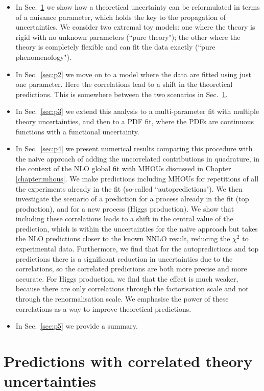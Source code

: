\begin{itemize}
\item In Sec.~\ref{sec:p1} we show how a theoretical uncertainty can be reformulated in terms of a nuisance parameter, which holds the key to the propagation of uncertainties. We consider two extremal toy models: one where the theory is rigid with no unknown parameters (``pure theory"); the other where the theory is completely flexible and can fit the data exactly (``pure phenomenology"). 
\item In Sec.~\ref{sec:p2} we move on to a model where the data are fitted using just one parameter. Here the correlations lead to a shift in the theoretical predictions. This is somewhere between the two scenarios in Sec.~\ref{sec:p1}.
\item In Sec.~\ref{sec:p3} we extend this analysis to a multi-parameter fit with multiple theory uncertainties, and then to a PDF fit, where the PDFs are continuous functions with a functional uncertainty. 
\item In Sec.~\ref{sec:p4} we present numerical results comparing this procedure with the naive approach of adding the uncorrelated contributions in quadrature, in the context of the NLO global fit with MHOUs discussed in Chapter \ref{chapter:mhous}. We make predictions including MHOUs for repetitions of all the experiments already in the fit (so-called ``autopredictions"). We then investigate the scenario of a prediction for a process already in the fit (top production), and for a new process (Higgs production). We show that including these correlations leads to a shift in the central value of the prediction, which is within the uncertainties for the naive approach but takes the NLO predictions closer to the known NNLO result, reducing the $\chi^2$ to experimental data. Furthermore, we find that for the autopredictions and top predictions there is a significant reduction in uncertainties due to the correlations, so the correlated predictions are both more precise and more accurate. For Higgs production, we find that the effect is much weaker, because there are only correlations through the factorisation scale and not through the renormalisation scale. We emphasise the power of these correlations as a way to improve theoretical predictions.
\item In Sec.~\ref{sec:p5} we provide a summary.
\end{itemize}

\section{Predictions with correlated theory uncertainties}
\label{sec:p1}

